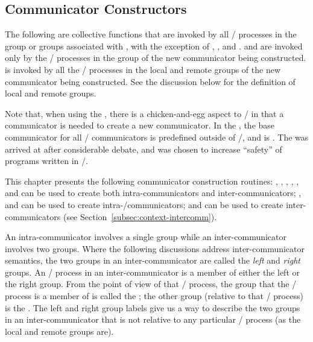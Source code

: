 \subsection{Communicator Constructors}
\label{subsec:context-intracomconst}
The following are collective functions that are invoked by all \MPI/ processes in the
group or groups associated with ,
with the exception of ,
, and\flushline
{}.
 and 
are invoked only by the \MPI/ processes in the group of the new communicator being constructed.\flushline
{} is invoked by
all the \MPI/ processes in the local and remote groups of the new communicator being constructed.
See the discussion below for the definition of local and remote groups.

\begin{rationale}
Note that, when using the \wpm{}, there is a chicken-and-egg aspect to \MPI/ in that a
communicator is needed to create a new communicator. In the \wpm{}, the base
communicator for all \MPI/ communicators is predefined outside of \MPI/,
and is . The \wpm{} was arrived at after
considerable debate, and was chosen to increase ``safety'' of programs
written in \MPI/.
\end{rationale}


This chapter presents
the following communicator construction routines: , ,
,\flushline %
, ,  \flushline %
and  can be used to create both intra-communicators and
inter-communicators; ,  and
can be used to create
intra\hyphen/communicators;  and 
can be used to create inter-communicators (see Section~\ref{subsec:context-intercomm}).

An intra-communicator involves a single group while an inter-communicator
involves two groups.
Where the following discussions address inter-communicator semantics,
the two groups in an inter-communicator are
called the \emph{left} and \emph{right} groups. An \MPI/ process in an
inter-communicator is a member of either the left or the right group. From the
point of view of that \MPI/ process, the
group that the \MPI/ process is a member of is called the ; the
other group (relative to that \MPI/ process) is the .
The left and right group labels give us a way to describe the two groups in
an inter-communicator that is not relative to any particular \MPI/ process (as the
local and remote groups are).

